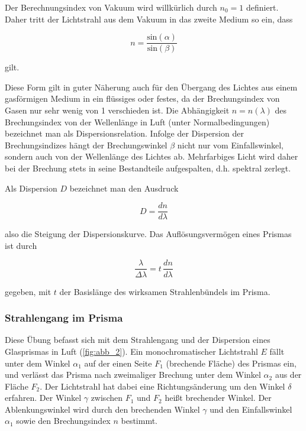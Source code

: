 \documentclass[11pt,ngerman]{scrartcl}
\begin{document}
Der Berechnungsindex von Vakuum wird willkürlich durch $n_0 = 1$ definiert. Daher tritt der
Lichtstrahl aus dem Vakuum in das zweite Medium so ein, dass

\begin{equation}
	n = \frac{\textrm{sin}(\alpha)}{\textrm{sin}(\beta)}
\end{equation}

gilt.

Diese Form gilt in guter Näherung auch für den Übergang des Lichtes aus einem gasförmigen
Medium in ein flüssiges oder festes, da der Brechungsindex von Gasen nur sehr wenig von 1
verschieden ist. Die Abhängigkeit $n = n(\lambda)$ des Brechungsindex von der Wellenlänge in Luft
(unter Normalbedingungen) bezeichnet man als Dispersionsrelation. Infolge der Dispersion der
Brechungsindizes hängt der Brechungswinkel $\beta$ nicht nur vom Einfallswinkel, sondern auch von
der Wellenlänge des Lichtes ab. Mehrfarbiges Licht wird daher bei der Brechung stets in seine
Bestandteile aufgespalten, d.h. spektral zerlegt.

Als Dispersion $D$ bezeichnet man den Ausdruck

\begin{equation}
	D = \frac{dn}{d\lambda}
\end{equation}

also die Steigung der Dispersionskurve. Das Auflösungsvermögen eines Prismas ist durch

\begin{equation}
	\frac{\lambda}{\Delta \lambda} = t\, \frac{dn}{d\lambda}
\end{equation}

gegeben, mit $t$ der Basislänge des wirksamen Strahlenbündels im Prisma.

\subsubsection{Strahlengang im Prisma}

Diese Übung befasst sich mit dem Strahlengang und der Dispersion eines Glasprismas in Luft
(\autoref{fig:abb_2}). Ein monochromatischer Lichtstrahl $E$ fällt unter dem Winkel $\alpha_1$ auf der einen Seite
$F_1$ (brechende Fläche) des Prismas ein, und verlässt das Prisma nach zweimaliger Brechung
unter dem Winkel $\alpha_2$ aus der Fläche $F_2$. Der Lichtstrahl hat dabei eine Richtungsänderung
um den Winkel $\delta$ erfahren. Der Winkel $\gamma$ zwischen $F_1$ und $F_2$ heißt brechender Winkel. Der
Ablenkungswinkel wird durch den brechenden Winkel $\gamma$ und den Einfallswinkel $\alpha_1$ sowie den
Brechungsindex $n$ bestimmt.
\end{document}
